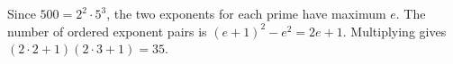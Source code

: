 Since $ 500=2^2\cdot5^3 $, the two exponents for each prime have maximum $ e $. The number of ordered exponent pairs is $(e+1)^2-e^2=2e+1 $. Multiplying gives $(2\cdot2+1)(2\cdot3+1)=\boxed{35}$.

